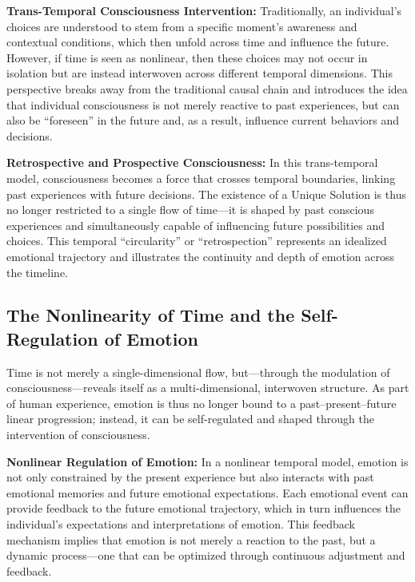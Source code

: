 \documentclass[12pt]{article}
\begin{document}
\textbf{Trans-Temporal Consciousness Intervention:} Traditionally, an individual's choices are understood to stem from a specific moment's awareness and contextual conditions, which then unfold across time and influence the future. However, if time is seen as nonlinear, then these choices may not occur in isolation but are instead interwoven across different temporal dimensions. This perspective breaks away from the traditional causal chain and introduces the idea that individual consciousness is not merely reactive to past experiences, but can also be “foreseen” in the future and, as a result, influence current behaviors and decisions.

\textbf{Retrospective and Prospective Consciousness:} In this trans-temporal model, consciousness becomes a force that crosses temporal boundaries, linking past experiences with future decisions. The existence of a Unique Solution is thus no longer restricted to a single flow of time—it is shaped by past conscious experiences and simultaneously capable of influencing future possibilities and choices. This temporal “circularity” or “retrospection” represents an idealized emotional trajectory and illustrates the continuity and depth of emotion across the timeline.
\subsection{The Nonlinearity of Time and the Self-Regulation of Emotion}

Time is not merely a single-dimensional flow, but—through the modulation of consciousness—reveals itself as a multi-dimensional, interwoven structure. As part of human experience, emotion is thus no longer bound to a past–present–future linear progression; instead, it can be self-regulated and shaped through the intervention of consciousness.

\textbf{Nonlinear Regulation of Emotion:} In a nonlinear temporal model, emotion is not only constrained by the present experience but also interacts with past emotional memories and future emotional expectations. Each emotional event can provide feedback to the future emotional trajectory, which in turn influences the individual’s expectations and interpretations of emotion. This feedback mechanism implies that emotion is not merely a reaction to the past, but a dynamic process—one that can be optimized through continuous adjustment and feedback.
\end{document}
